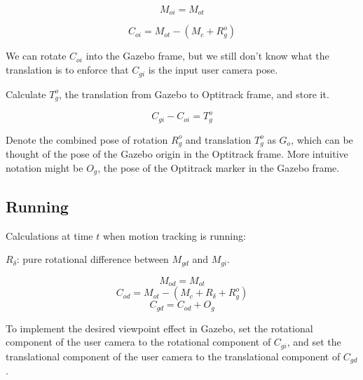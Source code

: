 \documentclass[11pt, letterpaper]{article}
\begin{document}
\begin{equation}
M_{oi} = M_{ot}
\end{equation}

\begin{equation}
C_{oi} = M_{ot} - (M_c + R^o_g)
\end{equation}

We can rotate $C_{oi}$ into the Gazebo frame, but we still don't know what the translation is to enforce that $C_{gi}$ is the input user camera pose.

Calculate $T^o_g$, the translation from Gazebo to Optitrack frame, and store it.

\begin{equation}
C_{gi} - C_{oi} = T^o_g
\end{equation}

Denote the combined pose of rotation $R^o_g$ and translation $T^o_g$ as $G_o$, which can be thought of the pose of the Gazebo origin in the Optitrack frame. More intuitive notation might be $O_g$, the pose of the Optitrack marker in the Gazebo frame.

\subsection{Running}
Calculations at time $t$ when motion tracking is running:

$R_{\delta}$: pure rotational difference between $M_{gd}$ and $M_{gi}$.

\begin{equation}
M_{od} = M_{ot}
\end{equation}
\begin{equation}
C_{od} = M_{ot} - (M_c + R_{\delta} + R^o_g)
\end{equation}
\begin{equation}
C_{gd} = C_{od} + O_g
\end{equation}

To implement the desired viewpoint effect in Gazebo, set the rotational component of the user camera to the rotational component of $C_{gi}$, and set the translational component of the user camera to the translational component of $C_{gd}$.
\end{document}
